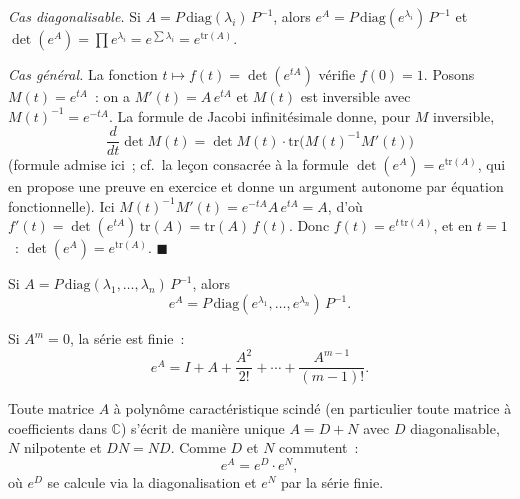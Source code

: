 \begin{mdframed}[style=proofbar]
  \textit{Cas diagonalisable.} Si $A = P\,\mathrm{diag}(\lambda_i)\,P^{-1}$, alors
  $e^A = P\,\mathrm{diag}(e^{\lambda_i})\,P^{-1}$ et
  $\det(e^A) = \prod e^{\lambda_i} = e^{\sum\lambda_i} = e^{\mathrm{tr}(A)}$.

  \textit{Cas général.} La fonction $t\mapsto f(t) = \det(e^{tA})$ vérifie
  $f(0)=1$. Posons $M(t) = e^{tA}$~: on a $M'(t) = A\,e^{tA}$ et $M(t)$ est
  inversible avec $M(t)^{-1} = e^{-tA}$. La formule de Jacobi infinitésimale
  donne, pour $M$ inversible,
  \[
    \frac{d}{dt}\det M(t) = \det M(t)\cdot\mathrm{tr}\bigl(M(t)^{-1}M'(t)\bigr)
  \]
  (formule admise ici~; cf.\ la leçon consacrée à la formule
  $\det(e^A) = e^{\mathrm{tr}(A)}$, qui en propose une preuve en exercice et
  donne un argument autonome par équation fonctionnelle).
  Ici $M(t)^{-1}M'(t) = e^{-tA}A\,e^{tA} = A$, d'où
  $f'(t) = \det(e^{tA})\,\mathrm{tr}(A) = \mathrm{tr}(A)\,f(t)$.
  Donc $f(t) = e^{t\,\mathrm{tr}(A)}$, et en $t=1$~: $\det(e^A) = e^{\mathrm{tr}(A)}$.
  $\blacksquare$
\end{mdframed}

\decsep{}


Si $A = P\,\mathrm{diag}(\lambda_1,\ldots,\lambda_n)\,P^{-1}$, alors
\[
  e^A = P\,\mathrm{diag}(e^{\lambda_1},\ldots,e^{\lambda_n})\,P^{-1}.
\]

Si $A^m = 0$, la série est finie~:
\[
  e^A = I + A + \frac{A^2}{2!} + \cdots + \frac{A^{m-1}}{(m-1)!}.
\]

Toute matrice $A$ à polynôme caractéristique scindé (en particulier toute
matrice à coefficients dans $\mathbb{C}$) s'écrit de manière unique
$A = D + N$ avec $D$ diagonalisable, $N$ nilpotente et $DN = ND$. Comme $D$ et
$N$ commutent~:
\[
  e^A = e^D \cdot e^N,
\]
où $e^D$ se calcule via la diagonalisation et $e^N$ par la série finie.

